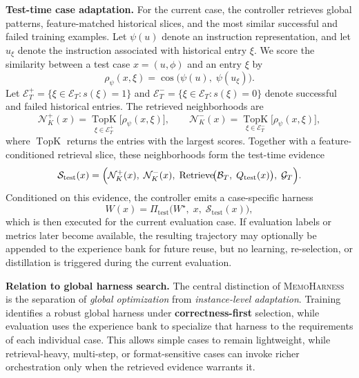 \documentclass{article}
\newcommand{\method}{\textsc{MemoHarness}\xspace}
\newcommand{\narraemph}[1]{\textcolor{narrareddeep}{\textbf{#1}}}
\newcommand{\methodlabel}[1]{\noindent\textbf{\textcolor{narrareddeep}{#1}}}
\begin{document}
\methodlabel{Test-time case adaptation.}
For the current case, the controller retrieves global patterns,
feature-matched historical slices, and the most similar successful and failed
training examples. Let $\psi(u)$ denote an instruction representation, and let
$u_\xi$ denote the instruction associated with historical entry $\xi$. We score
the similarity between a test case $x=(u,\phi)$ and an entry $\xi$ by
\begin{equation}
\label{eq:similarity}
\rho_\psi(x,\xi)
=
\cos\!\bigl(\psi(u),\; \psi(u_\xi)\bigr).
\end{equation}
Let
$\mathcal{E}_T^{+}=\{\xi\in\mathcal{E}_T: s(\xi)=1\}$ and
$\mathcal{E}_T^{-}=\{\xi\in\mathcal{E}_T: s(\xi)=0\}$ denote successful and
failed historical entries. The retrieved neighborhoods are
\begin{equation}
\label{eq:neighbors}
\mathcal{N}^{+}_K(x)
=
\operatorname*{TopK}_{\xi \in \mathcal{E}_T^{+}}
\bigl[\rho_\psi(x,\xi)\bigr],
\qquad
\mathcal{N}^{-}_K(x)
=
\operatorname*{TopK}_{\xi \in \mathcal{E}_T^{-}}
\bigl[\rho_\psi(x,\xi)\bigr],
\end{equation}
where $\operatorname*{TopK}$ returns the entries with the largest scores.
Together with a feature-conditioned retrieval slice, these neighborhoods form
the test-time evidence
\begin{equation}
\label{eq:test_evidence}
\mathcal{S}_{\mathrm{test}}(x)
=
\Bigl(
\mathcal{N}^{+}_K(x),\;
\mathcal{N}^{-}_K(x),\;
\mathrm{Retrieve}\!\bigl(\mathcal{B}_T,\; Q_{\mathrm{test}}(x)\bigr),\;
\mathcal{G}_T
\Bigr).
\end{equation}
Conditioned on this evidence, the controller emits a case-specific harness
\begin{equation}
\label{eq:test_adapt}
W(x)
=
\Pi_{\mathrm{test}}\!\bigl(W^\star,\; x,\; \mathcal{S}_{\mathrm{test}}(x)\bigr),
\end{equation}
which is then executed for the current evaluation case. If evaluation labels or metrics later
become available, the resulting trajectory may optionally be appended to the
experience bank for future reuse, but no learning, re-selection, or
distillation is triggered during the current evaluation.

\methodlabel{Relation to global harness search.}
The central distinction of \method is the separation of
\emph{global optimization} from \emph{instance-level adaptation}.
Training identifies a robust global harness under \narraemph{correctness-first}
selection, while evaluation uses the experience bank to specialize that harness
to the requirements of each individual case.
This allows simple cases to remain lightweight, while retrieval-heavy,
multi-step, or format-sensitive cases can invoke richer orchestration only when
the retrieved evidence warrants it.
\end{document}
